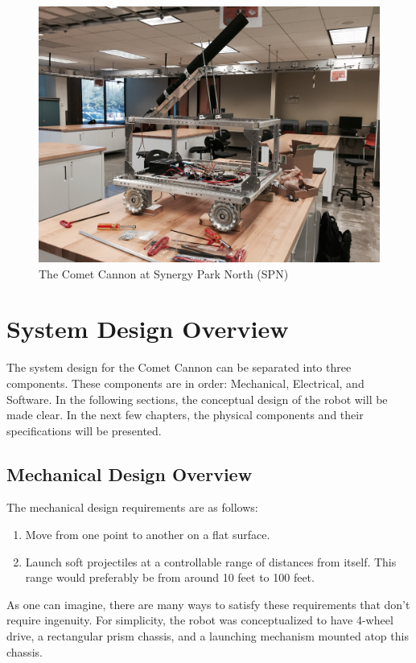 \documentclass[letterpaper,12pt]{report}
\newcommand{\botname}{Comet Cannon }
\begin{document}
\begin{figure}[!h]
\centering
    \includegraphics[width=14cm]{./pics/chassis/robot.jpg}
    \caption{The \botname at Synergy Park North (SPN)}
\end{figure}

\pagebreak
\tableofcontents
\pagebreak

\chapter{System Design Overview}
The system design for the \botname can be separated into three components.
These components are in order: Mechanical, Electrical, and Software. In the
following sections, the conceptual design of the robot will be made clear. In
the next few chapters, the physical components and their specifications will be
presented.

\section{Mechanical Design Overview}
The mechanical design requirements are as follows:

\begin{enumerate}
    \item Move from one point to another on a flat surface.
    \item Launch soft projectiles at a controllable range of distances from
        itself. This range would preferably be from around 10 feet to 100 feet.
\end{enumerate}

As one can imagine, there are many ways to satisfy these requirements that
don't require ingenuity. For simplicity, the robot was conceptualized to
have 4-wheel drive, a rectangular prism chassis, and a launching mechanism
mounted atop this chassis.\\
\end{document}
